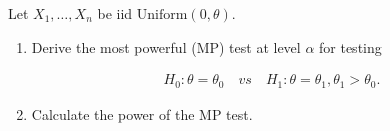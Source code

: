 
\begin{exercise}

Let $X_1, \dots, X_n$ be iid $\mathrm{Uniform}(0, \theta)$.

\begin{enumerate}

    \item Derive the most powerful (MP) test at level $\alpha$ for testing
    
    \begin{align*}
        H_0: \theta = \theta_0
        \quad
        \textit{vs}
        \quad
        H_1: \theta = \theta_1, \theta_1 > \theta_0.
    \end{align*}

    \item Calculate the power of the MP test.

\end{enumerate}

\end{exercise}


\begin{solution}

\phantom{}

\end{solution}

